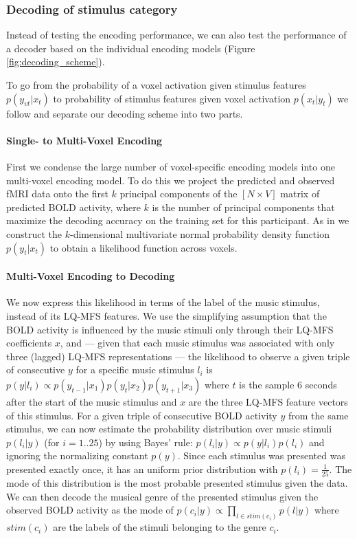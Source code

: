 \subsubsection*{Decoding of stimulus category}

Instead of testing the encoding performance, we can also test the performance
of a decoder based on the individual encoding models \citep{NG11} (Figure
\ref{fig:decoding_scheme}).


To go from the probability of a voxel activation
given stimulus features $p(y_{vt}|x_{t})$ to probability of stimulus features
given voxel activation $p(x_{t}|y_{t})$ we follow \citet{NG09} and separate our
decoding scheme into two parts. 

\paragraph{Single- to Multi-Voxel Encoding}

First we condense the large number of voxel-specific encoding models into one
multi-voxel encoding model.  To do this we project the predicted and observed
f{MRI} data onto the first $k$ principal components of the $[N\times V]$ matrix
of predicted BOLD activity, where $k$ is the number of principal components
that maximize the decoding accuracy on the training set for this participant.
As in \citet{NG09} we construct the $k$-dimensional multivariate normal
probability density function $p(y_{t}|x_{t})$ to obtain a likelihood function
across voxels. 


\paragraph{Multi-Voxel Encoding to Decoding}

We now express this likelihood in terms of the label of the music stimulus, instead of its LQ-MFS features.  We
use the simplifying assumption that the BOLD activity is influenced by the
music stimuli only through their LQ-MFS coefficients $x$, and --- given that
each music stimulus was associated with only three (lagged) LQ-MFS
representations --- the likelihood to observe a given triple of consecutive $y$
for a specific music stimulus $l_{i}$ is $p(y|l_{i}) \propto
p(y_{t-1}|x_{1})p(y_{t}|x_{2})p(y_{t+1}|x_{3})$ where $t$ is the sample 6
seconds after the start of the music stimulus and $x$ are the three LQ-MFS
feature vectors of this stimulus.  For a given triple of consecutive BOLD
activity $y$ from the same stimulus, we can now estimate the probability
distribution over music stimuli $p(l_{i}|y)$ (for $i=1..25$) by using Bayes'
rule: $p(l_{i}|y) \propto p(y|l_{i})p(l_{i})$ and ignoring the normalizing
constant $p(y)$. Since each stimulus was presented was presented exactly once,
it has an uniform prior distribution with $p(l_{i})=\frac{1}{25}$. The mode of
this distribution is the most probable presented stimulus given the data.  We
can then decode the musical genre of the presented stimulus given the observed
BOLD activity as the mode of $p(c_{i}|y) \propto \prod\nolimits_{l \in
  stim(c_{i})} p(l|y)$ where $stim(c_{i})$ are the labels of the stimuli
  belonging to the genre $c_{i}$. 

